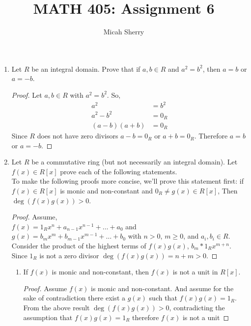 \documentclass{article}
\title{MATH 405: Assignment 6}
\author{Micah Sherry}
\begin{document}
	\maketitle
	\begin{enumerate}
		\item Let $R$ be an integral domain. Prove that if $a, b \in R$ and $a^2 = b^2$, then $a = b$ or $a = -b$.
		\begin{proof}
		
			Let $a,b \in R$ with $a^2 = b^2$.
			So,
			\begin{align*}
				a^2 	   &= b^2\\
				a^2-b^2    &= 0_R\\
				(a-b)(a+b) &= 0_R
			\end{align*}  
			Since $R$ does not have zero divisors $a-b = 0_R$ or $a+b = 0_R$. Therefore $a = b$ or $a = -b$.
		\end{proof}



		\item Let $R$ be a commutative ring (but not necessarily an integral domain). 
		Let $f(x) \in R[x]$ prove each of the following statements. \\ 
		To make the following proofs more concise, we'll prove this statement first:
		if $f(x) \in R[x]$ is monic and non-constant and $0_R \not=g(x) \in R[x]$, Then $\deg(f(x)g(x))>0$.
		\begin{proof}
			Assume,\\$f(x) = 1_Rx^n+ a_{n-1}x^{n-1} + \ldots + a_0$ and\\
			$g(x) = b_mx^m+b_{m-1}x^{m-1} + \ldots + b_0$ with $n>0$, $m \geq 0$, and $a_i, b_i \in R$.\\
			Consider the product of the highest terms of $f(x)g(x)$, $b_m*1_Rx^{m+n}$.
		Since $1_R$ is not a zero divisor $\deg(f(x)g(x)) = n + m >0$.
		\end{proof}

		\begin{enumerate}
			\item If $f(x)$ is monic and non-constant, then $f(x)$ is not a unit in $R[x]$.
			\begin{proof}
				Assume $f(x)$ is monic and non-constant.
				And assume for the sake of contradiction there exist a $g(x)$ such that $f(x)g(x) = 1_R$. 
				From the above result $\deg(f(x)g(x))>0$, contradicting the assumption that $f(x)g(x) = 1_R$ 
				therefore $f(x)$ is not a unit
			\end{proof} 


\end{enumerate}
\end{enumerate}
\end{document}
